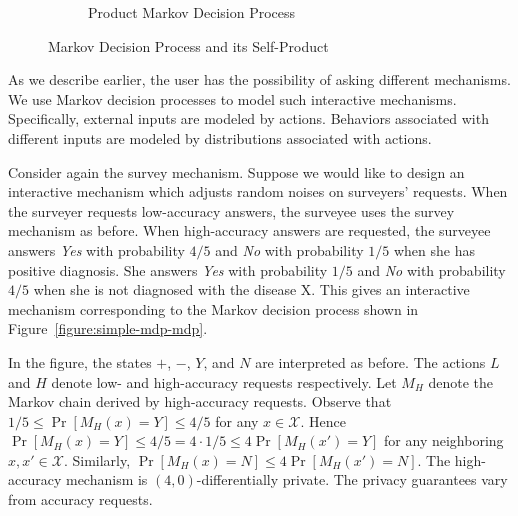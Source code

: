 \begin{figure}
\begin{subfigure}{.58\columnwidth}
{{
}
    }
    \caption{Product Markov Decision Process}
    \label{figure:simple-mdp-product}
  \end{subfigure}
  \caption{Markov Decision Process and its Self-Product}
  \label{figure:simple-mdp}
\end{figure}


As we describe earlier, the user has the possibility of asking different mechanisms.
We use Markov decision processes to model such
interactive mechanisms. Specifically, external inputs are modeled by
actions. Behaviors associated with different inputs are modeled by
distributions associated with actions.


Consider again the survey mechanism. Suppose we would like to design
an interactive mechanism which adjusts random noises on surveyers'
requests. When the surveyer requests low-accuracy answers, the
surveyee uses the survey mechanism as before. When high-accuracy
answers are requested, the surveyee answers \textit{Yes} with
probability $4/5$ and \textit{No} with probability $1/5$ when she has
positive diagnosis. She answers \textit{Yes} with probability $1/5$
and \textit{No} with probability $4/5$ when she is not
diagnosed with the disease X. This gives an interactive mechanism
corresponding to the Markov decision process shown in
Figure~\ref{figure:simple-mdp-mdp}.

In the figure, the states $+$,
$-$, $Y$, and $N$ are interpreted as before. The actions $L$ and $H$
denote low- and high-accuracy requests respectively. Let $M_H$ denote
the Markov chain derived by high-accuracy requests.
Observe that $1/5 \leq \Pr[M_H(x) = Y] \leq 4/5$ for any $x
\in \mathcal{X}$. Hence $\Pr[M_H (x) = Y] \leq 4/5 = 4 \cdot 1/5 \leq
4 \Pr[M_H (x') = Y]$ for any neighboring $x, x' \in
\mathcal{X}$. Similarly, $\Pr[M_H (x) = N] \leq 4 \Pr[M_H (x') =
N]$. The high-accuracy mechanism is $(4,0)$-differentially private.
The privacy guarantees vary from accuracy requests.

